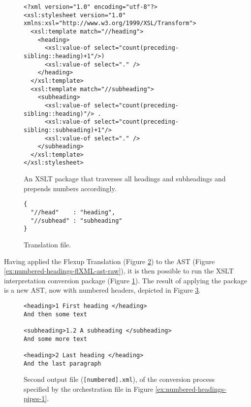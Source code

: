 \documentclass{scrreprt}
\begin{document}
\begin{figure}[h]
\begin{lstlisting}
<?xml version="1.0" encoding="utf-8"?>
<xsl:stylesheet version="1.0" xmlns:xsl="http://www.w3.org/1999/XSL/Transform">
  <xsl:template match="//heading">
    <heading>
      <xsl:value-of select="count(preceding-sibling::heading)+1"/>)
      <xsl:value-of select="." />
    </heading>
  </xsl:template>
  <xsl:template match="//subheading">
    <subheading>
      <xsl:value-of select="count(preceding-sibling::heading)"/> . 
      <xsl:value-of select="count(preceding-sibling::subheading)+1"/>
      <xsl:value-of select="." />
    </subheading>
  </xsl:template>
</xsl:stylesheet>
\end{lstlisting}
\caption{An XSLT package that traverses all headings and subheadings and prepends numbers accordingly.}
\label{ex:numbered-headings-xslt-package}
\end{figure}



\begin{figure}[h]
\begin{lstlisting}
{
  "//head"    : "heading",
  "//subhead" : "subheading"
}
\end{lstlisting}
\caption{Translation file.}
\label{ex:numbered-headings-translation-fupt}
\end{figure}


Having applied the Flexup Translation (Figure \ref{ex:numbered-headings-translation-fupt}) to the AST (Figure \ref{ex:numbered-headings-flXML-ast-raw}), it is then possible to run the XSLT interpretation conversion package (Figure \ref{ex:numbered-headings-xslt-package}). The result of applying the package is a new AST, now with numbered headers, depicted in Figure \ref{ex:numbered-headings-flXML-ast-numbered}.

\begin{figure}[h]
\begin{lstlisting}
<heading>1 First heading </heading>
And then some text

<subheading>1.2 A subheading </subheading>
And some more text

<heading>2 Last heading </heading>
And the last paragraph
\end{lstlisting}
\caption{Second output file (\texttt{[numbered].xml}), of the conversion process specified by the orchestration file in Figure \ref{ex:numbered-headings-pipes-1}.}
\label{ex:numbered-headings-flXML-ast-numbered}
\end{figure}
\end{document}
